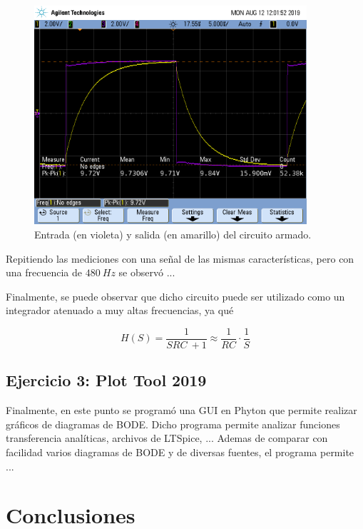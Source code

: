 \documentclass[a4paper]{article}
\begin{document}
\begin{figure}[H]
	\centering
	\includegraphics[width=0.9\textwidth , trim={0.7cm 6.25cm  0 3.5cm},clip]{scope_1}
\caption{Entrada (en violeta) y salida (en amarillo) del circuito armado.}
	\label{fig:medicion2}
\end{figure}

Repitiendo las mediciones con una señal de las mismas características, pero con una frecuencia de $ 480 \ Hz $ se observó ...

Finalmente, se puede observar que dicho circuito puede ser utilizado como un integrador atenuado a muy altas frecuencias, ya qué

\begin{equation}
	H \left(S \right) = \frac{1}{SRC \ + 1} \approx \frac{1}{RC} \cdot \frac{1}{S}
\end{equation}

\subsection{Ejercicio 3: Plot Tool 2019}
Finalmente, en este punto se programó una GUI en Phyton que permite realizar gráficos de diagramas de BODE. Dicho programa permite analizar funciones transferencia analíticas, archivos de LTSpice, ... 
Ademas de comparar con facilidad varios diagramas de BODE y de diversas fuentes, el programa permite ...

\section{Conclusiones}
\end{document}
